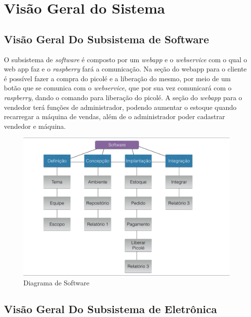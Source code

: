 \chapter{Visão Geral do Sistema}

\section{Visão Geral Do Subsistema de Software} 

O subsistema de \textit{software} é composto por um \textit{webapp} e o \textit{webservice} com o qual o web app faz e o \textit{raspberry} fará a comunicação. Na seção do webapp para o cliente é possível fazer a compra do picolé e a liberação do mesmo, por meio de um botão que se comunica com o \textit{webservice}, que por sua vez comunicará com o \textit{raspberry}, dando o comando para liberação do picolé. A seção do \textit{webapp} para o vendedor terá funções de administrador, podendo aumentar o estoque quando recarregar a máquina de vendas, além de o administrador poder cadastrar vendedor e máquina.

\begin{figure}[H]
	\centering
    \includegraphics[width=\textwidth]{figuras/vg_software}
    \caption{Diagrama de Software}
    \label{fig:vg_software}
\end{figure}




\section{Visão Geral Do Subsistema de Eletrônica}

